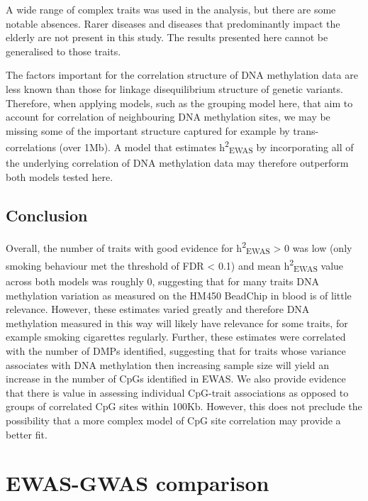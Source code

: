 \documentclass[11pt,oneside]{bristolthesis}
\begin{document}
A wide range of complex traits was used in the analysis, but there are some notable absences. Rarer diseases and diseases that predominantly impact the elderly are not present in this study. The results presented here cannot be generalised to those traits.

The factors important for the correlation structure of DNA methylation data are less known than those for linkage disequilibrium structure of genetic variants. Therefore, when applying models, such as the grouping model here, that aim to account for correlation of neighbouring DNA methylation sites, we may be missing some of the important structure captured for example by trans-correlations (over 1Mb). A model that estimates h\textsuperscript{2}\textsubscript{EWAS} by incorporating all of the underlying correlation of DNA methylation data may therefore outperform both models tested here.

\hypertarget{conclusion-05}{%
\section{Conclusion}\label{conclusion-05}}

Overall, the number of traits with good evidence for h\textsuperscript{2}\textsubscript{EWAS} \textgreater{} 0 was low (only smoking behaviour met the threshold of FDR \textless{} 0.1) and mean h\textsuperscript{2}\textsubscript{EWAS} value across both models was roughly 0, suggesting that for many traits DNA methylation variation as measured on the HM450 BeadChip in blood is of little relevance. However, these estimates varied greatly and therefore DNA methylation measured in this way will likely have relevance for some traits, for example smoking cigarettes regularly. Further, these estimates were correlated with the number of DMPs identified, suggesting that for traits whose variance associates with DNA methylation then increasing sample size will yield an increase in the number of CpGs identified in EWAS. We also provide evidence that there is value in assessing individual CpG-trait associations as opposed to groups of correlated CpG sites within 100Kb. However, this does not preclude the possibility that a more complex model of CpG site correlation may provide a better fit.

\hypertarget{ewas-gwas-comp-chapter}{%
\chapter{EWAS-GWAS comparison}\label{ewas-gwas-comp-chapter}}
\end{document}

